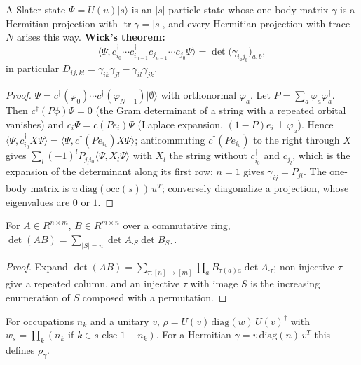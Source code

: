 \begin{theorem}\label{thm:wick-slater}
  \leanok
  A Slater state $\Psi=U(u)|s\rangle$ is an $|s|$-particle state whose one-body matrix $\gamma$ is a Hermitian projection with
  $\operatorname{tr}\gamma=|s|$, and every Hermitian projection with trace $N$ arises this way. \textbf{Wick's theorem:}
  \[\langle\Psi,c^\dagger_{i_0}\cdots c^\dagger_{i_{n-1}}c_{j_{n-1}}\cdots c_{j_0}\Psi\rangle=\det\big(\gamma_{i_aj_b}\big)_{a,b},\]
  in particular $D_{ij,kl}=\gamma_{ik}\gamma_{jl}-\gamma_{il}\gamma_{jk}$.
\end{theorem}
\begin{proof}\leanok
  $\Psi=c^\dagger(\varphi_0)\cdots c^\dagger(\varphi_{N-1})|\emptyset\rangle$ with orthonormal $\varphi_a$. Let $P=\sum_a\varphi_a\varphi_a^\dagger$.
  Then $c^\dagger(P\phi)\Psi=0$ (the Gram determinant of a string with a repeated orbital vanishes) and $c_i\Psi=c(Pe_i)\Psi$
  (Laplace expansion, $(1-P)e_i\perp\varphi_a$). Hence
  $\langle\Psi,c^\dagger_{i_0}X\Psi\rangle=\langle\Psi,c^\dagger(Pe_{i_0})X\Psi\rangle$; anticommuting $c^\dagger(Pe_{i_0})$ to the right through
  $X$ gives $\sum_l(-1)^lP_{j_li_0}\langle\Psi,X_l\Psi\rangle$ with $X_l$ the string without $c^\dagger_{i_0}$ and $c_{j_l}$, which is
  the expansion of the determinant along its first row; $n=1$ gives $\gamma_{ij}=P_{ji}$. The one-body matrix is
  $\bar u\,\mathrm{diag}(\mathrm{occ}(s))\,u^{T}$; conversely diagonalize a projection, whose eigenvalues are $0$ or $1$.
\end{proof}

\begin{lemma}\label{lem:cauchy-binet}
  \leanok
  For $A\in R^{n\times m}$, $B\in R^{m\times n}$ over a commutative ring,
  $\det(AB)=\sum_{|S|=n}\det A_{\cdot S}\det B_{S\cdot}$.
\end{lemma}
\begin{proof}\leanok
  Expand $\det(AB)=\sum_{\tau:[n]\to[m]}\prod_aB_{\tau(a)a}\det A_{\cdot\tau}$; non-injective $\tau$ give a repeated column, and an
  injective $\tau$ with image $S$ is the increasing enumeration of $S$ composed with a permutation.
\end{proof}

\begin{definition}\label{def:quasi-free}
  \leanok
  For occupations $n_k$ and a unitary $v$, $\rho=U(v)\,\mathrm{diag}(w)\,U(v)^\dagger$ with
  $w_s=\prod_k(n_k\text{ if }k\in s\text{ else }1-n_k)$. For a Hermitian $\gamma=\bar v\,\mathrm{diag}(n)\,v^T$ this defines $\rho_\gamma$.
\end{definition}


